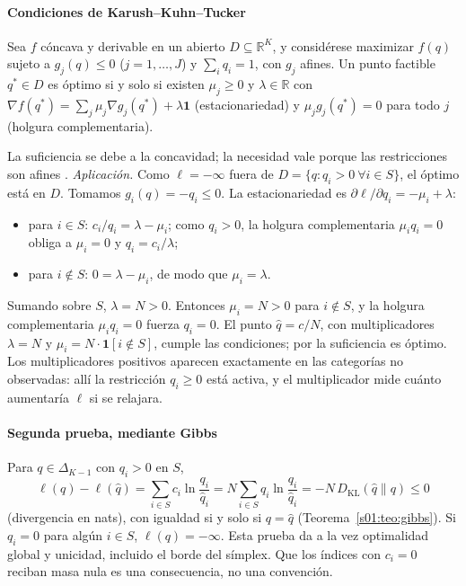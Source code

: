 \paragraph{Condiciones de Karush--Kuhn--Tucker}
\begin{teorema}\label{s01:teo:kkt}
Sea $f$ cóncava y derivable en un abierto $D\subseteq\mathbb R^K$, y considérese
maximizar $f(q)$ sujeto a $g_j(q)\le0$ ($j=1,\ldots,J$) y $\sum_iq_i=1$, con $g_j$
afines. Un punto factible $q^*\in D$ es óptimo si y solo si existen
$\mu_j\ge0$ y $\lambda\in\mathbb R$ con
$\nabla f(q^*)=\sum_j\mu_j\nabla g_j(q^*)+\lambda\mathbf 1$ (estacionariedad) y
$\mu_jg_j(q^*)=0$ para todo $j$ (holgura complementaria).
\end{teorema}
\noindent La suficiencia se debe a la concavidad; la necesidad vale porque las
restricciones son afines \citep[sec.~5.5.3]{boyd2004convex}.
\emph{Aplicación.} Como $\ell=-\infty$ fuera de
$D=\{q:q_i>0\ \forall i\in S\}$, el óptimo está en $D$. Tomamos
$g_i(q)=-q_i\le0$. La estacionariedad es
$\partial\ell/\partial q_i=-\mu_i+\lambda$:
\begin{itemize}
\item para $i\in S$: $c_i/q_i=\lambda-\mu_i$; como $q_i>0$, la holgura
complementaria $\mu_iq_i=0$ obliga a $\mu_i=0$ y $q_i=c_i/\lambda$;
\item para $i\notin S$: $0=\lambda-\mu_i$, de modo que $\mu_i=\lambda$.
\end{itemize}
Sumando sobre $S$, $\lambda=N>0$. Entonces $\mu_i=N>0$ para $i\notin S$, y la
holgura complementaria $\mu_iq_i=0$ fuerza $q_i=0$. El punto $\widehat q=c/N$, con
multiplicadores $\lambda=N$ y $\mu_i=N\cdot\mathbf 1[i\notin S]$, cumple las
condiciones; por la suficiencia es óptimo. Los multiplicadores positivos aparecen
exactamente en las categorías no observadas: allí la restricción $q_i\ge0$ está
activa, y el multiplicador mide cuánto aumentaría $\ell$ si se relajara.

\paragraph{Segunda prueba, mediante Gibbs}
Para $q\in\Delta_{K-1}$ con $q_i>0$ en $S$,
\[
\ell(q)-\ell(\widehat q)=\sum_{i\in S}c_i\ln\frac{q_i}{\widehat q_i}
=N\sum_{i\in S}\widehat q_i\ln\frac{q_i}{\widehat q_i}
=-N\,D_{\mathrm{KL}}(\widehat q\|q)\le0
\]
(divergencia en nats), con igualdad si y solo si $q=\widehat q$
(Teorema~\ref{s01:teo:gibbs}). Si $q_i=0$ para algún $i\in S$, $\ell(q)=-\infty$.
Esta prueba da a la vez optimalidad global y unicidad, incluido el borde del
símplex. Que los índices con $c_i=0$ reciban masa nula es una consecuencia, no
una convención.

